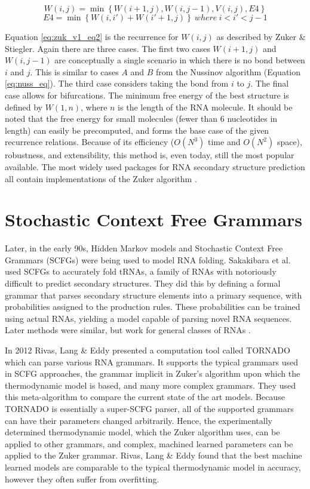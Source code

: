 \documentclass[12pt, a4paper]{article}
\begin{document}
\begin{equation} \label{eq:zuk_v1_eq2}
W (i, j) = \min \left\lbrace W(i + 1, j), W(i, j - 1), V(i, j), E4 \right\rbrace
\end{equation}
$$
E4 = \min \left\lbrace W (i, i') + W (i' + 1, j) \right\rbrace \: where \: i < i' < j - 1
$$

Equation \ref{eq:zuk_v1_eq2} is the recurrence for $W(i, j)$ as described by Zuker \& Stiegler.
Again there are three cases. The first two cases $W (i + 1, j)$ and $W(i, j - 1)$ are conceptually a single scenario in which there is no bond between $i$ and $j$. This is similar to cases $A$ and $B$ from the Nussinov algorithm (Equation \ref{eq:nuss_eq}). The third case considers taking the bond from
$i$ to $j$. The final case allows for bifurcations. The minimum free energy of the best structure is defined by $W(1, n)$, where $n$ is the length of the RNA molecule. It should
be noted that the free energy for small molecules (fewer than 6 nucleotides in length) can easily be
precomputed, and forms the base case of the given recurrence relations. Because of
its efficiency ($O(N^3)$ time and $O(N^2)$ space), robustness, and extensibility, this method is,
even today, still the most popular available. The most widely used packages for RNA secondary structure prediction all contain implementations of the Zuker algorithm \cite{lorenz2011viennarna, reuter2010rnastructure}.


\section{Stochastic Context Free Grammars}

Later, in the early 90s, Hidden Markov models and Stochastic Context Free Grammars (SCFGs) were being used to model RNA folding. Sakakibara et al. \cite{sakakibara1994stochastic} used SCFGs to accurately fold tRNAs, a family of RNAs with notoriously difficult to predict secondary structures. They did this by defining a formal grammar that parses secondary structure elements into a primary sequence, with probabilities assigned to the production rules. These probabilities can be trained using actual RNAs, yielding a model capable of parsing novel RNA sequences. Later methods were similar, but work for general classes of RNAs \cite{dowell2004evaluation, knudsen2003pfold}.

In 2012 Rivas, Lang \& Eddy \cite{rivas2012range} presented a computation tool called TORNADO which can parse various RNA grammars. It supports the typical grammars used in SCFG approaches, the grammar implicit in Zuker's algorithm upon which the thermodynamic model is based, and many more complex grammars. They used this meta-algorithm to compare the current state of the art models. Because TORNADO is essentially a super-SCFG parser, all of the supported grammars can have their parameters changed arbitrarily. Hence, the experimentally determined thermodynamic model, which the Zuker algorithm uses, can be applied to other grammars, and complex, machined learned parameters can be applied to the Zuker grammar. Rivas, Lang \& Eddy found that the best machine learned models are comparable to the typical thermodynamic model in accuracy, however they often suffer from overfitting.
\end{document}
